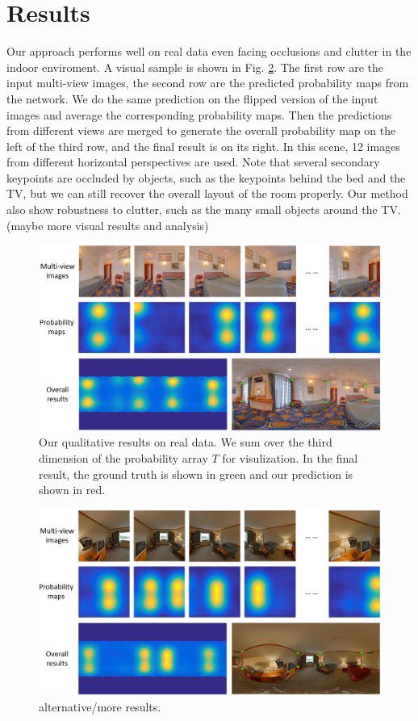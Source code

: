 

\section{Results}
Our approach performs well on real data even facing occlusions and clutter in the indoor enviroment. A visual sample is shown in Fig. \ref{fig:results1}. The first row are the input multi-view images, the second row are the predicted probability maps from the network. We do the same prediction on the flipped version of the input images and average the corresponding probability maps. Then the predictions from different views are merged to generate the overall probability map on the left of the third row, and the final result is on its right. In this scene, 12 images from different horizontal perspectives are used. Note that several secondary keypoints are occluded by objects, such as the keypoints behind the bed and the TV, but we can still recover the overall layout of the room properly. Our method also show robustness to clutter, such as the many small objects around the TV. (maybe more visual results and analysis)

\begin{figure}[ht]
	\centering
	\includegraphics[width=\linewidth]{figs/results2.png}
	\caption{Our qualitative results on real data. We sum over the third dimension of the probability array $T$ for visulization. In the final result, the ground truth is shown in green and our prediction is shown in red. }
	\label{fig:results1}
\end{figure}

\begin{figure}
	\centering
	\includegraphics[width=\linewidth]{figs/results3.png}
	\caption{alternative/more results. }
	\label{fig:results1}
\end{figure}


